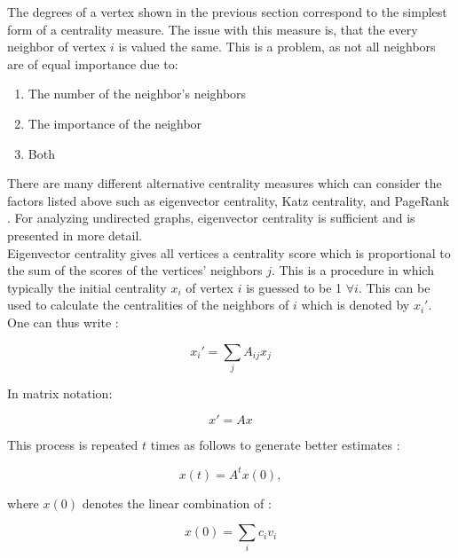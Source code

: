 	\noindent The degrees of a vertex shown in the previous section correspond 
	to the simplest form of a centrality measure. The issue with this measure 
	is, that the every neighbor of vertex $i$ is valued the same. This is a 
	problem, as not all neighbors are of equal importance due to:

	\begin{enumerate}
		\item The number of the neighbor's neighbors
		\item The importance of the neighbor
		\item Both
	\end{enumerate}

	\noindent There are many different alternative centrality measures which
	can consider the factors listed above such as eigenvector centrality, Katz
	centrality, and PageRank
	\citep{landau1895relativen,katz1953new,page1999pagerank}. For analyzing 
	undirected graphs, eigenvector centrality is sufficient and is presented in 
	more detail.\\

	\noindent Eigenvector centrality gives all vertices a centrality score which 
	is proportional to the sum of the scores of the vertices' neighbors $j$. 
	This is a procedure in which typically the initial centrality $x_i$ of 
	vertex $i$ is guessed to be 1 $\forall i$. This can be used to calculate the 
	centralities of the neighbors of $i$ which is denoted by $x_{i}'$. One can 
	thus write \citep[p. 169]{Newman2010}:

	\begin{equation}
		x_i' = \sum_{j}A_{ij}x_j
	\end{equation}

	\noindent In matrix notation:

	\begin{equation}
		x' = Ax
	\end{equation}

	\noindent This process is repeated $t$ times as follows to generate better 
	estimates \citep[p. 170]{Newman2010}:

	\begin{equation}
		x(t) =  A^tx(0),
	\end{equation}

	where $x(0)$ denotes the linear combination of 
	\citep[p. 170]{Newman2010}:

	\begin{equation}
		x(0) =  \sum_{i}c_{i}v_{i}
	\end{equation}

